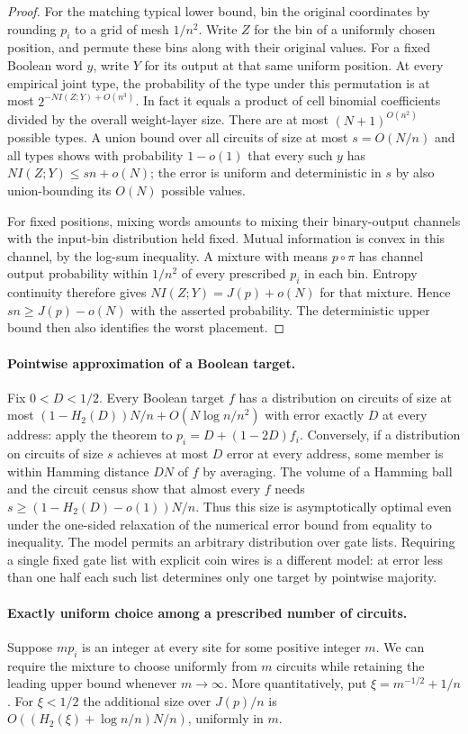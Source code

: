 \begin{proof}
For the matching typical lower bound, bin the original coordinates by rounding $p_i$ to a grid of mesh $1/n^2$. Write $Z$ for the bin of a uniformly chosen position, and permute these bins along with their original values. For a fixed Boolean word $y$, write $Y$ for its output at that same uniform position. At every empirical joint type, the probability of the type under this permutation is at most $2^{-NI(Z;Y)+O(n^3)}$. In fact it equals a product of cell binomial coefficients divided by the overall weight-layer size. There are at most $(N+1)^{O(n^2)}$ possible types. A union bound over all circuits of size at most $s=O(N/n)$ and all types shows with probability $1-o(1)$ that every such $y$ has $NI(Z;Y)\le sn+o(N)$; the error is uniform and deterministic in $s$ by also union-bounding its $O(N)$ possible values.

For fixed positions, mixing words amounts to mixing their binary-output channels with the input-bin distribution held fixed. Mutual information is convex in this channel, by the log-sum inequality. A mixture with means $p\circ\pi$ has channel output probability within $1/n^2$ of every prescribed $p_i$ in each bin. Entropy continuity therefore gives $NI(Z;Y)=J(p)+o(N)$ for that mixture. Hence $sn\ge J(p)-o(N)$ with the asserted probability. The deterministic upper bound then also identifies the worst placement.
\end{proof}

\paragraph{Pointwise approximation of a Boolean target.} Fix $0<D<1/2$. Every Boolean target $f$ has a distribution on circuits of size at most $(1-H_2(D))N/n+O(N\log n/n^2)$ with error exactly $D$ at every address: apply the theorem to $p_i=D+(1-2D)f_i$. Conversely, if a distribution on circuits of size $s$ achieves at most $D$ error at every address, some member is within Hamming distance $DN$ of $f$ by averaging. The volume of a Hamming ball and the circuit census show that almost every $f$ needs $s\ge(1-H_2(D)-o(1))N/n$. Thus this size is asymptotically optimal even under the one-sided relaxation of the numerical error bound from equality to inequality. The model permits an arbitrary distribution over gate lists. Requiring a single fixed gate list with explicit coin wires is a different model: at error less than one half each such list determines only one target by pointwise majority.

\paragraph{Exactly uniform choice among a prescribed number of circuits.}
Suppose $m p_i$ is an integer at every site for some positive integer $m$. We can require the mixture to choose uniformly from $m$ circuits while retaining the leading upper bound whenever $m\to\infty$. More quantitatively, put $\xi=m^{-1/2}+1/n$. For $\xi<1/2$ the additional size over $J(p)/n$ is $O((H_2(\xi)+\log n/n)N/n)$, uniformly in $m$.

